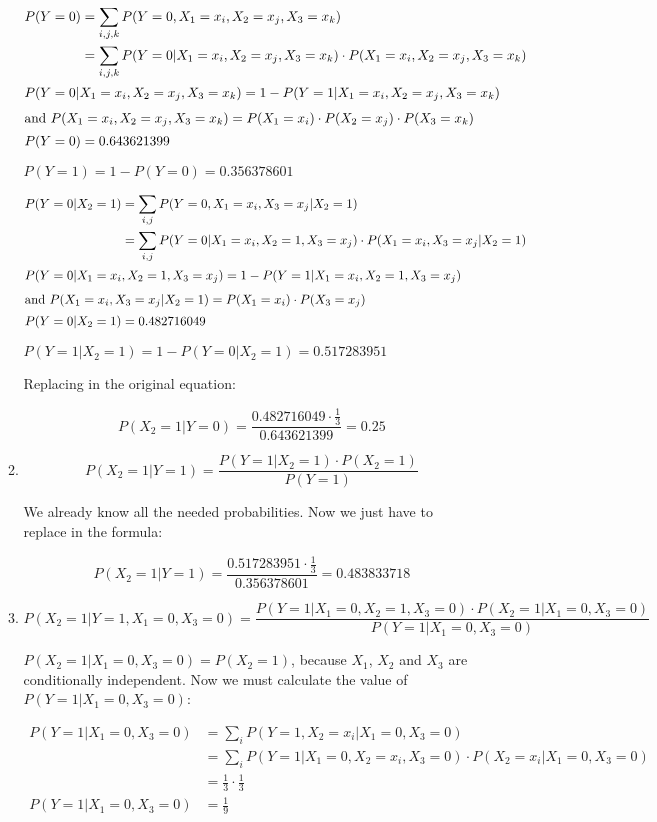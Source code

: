 \documentclass[11]{article}
\begin{document}
\begin{enumerate}[label=(\alph*)]
\begin{enumerate}[label*=.\arabic*]
\begin{align*}
P(Y=0) &= \sum_{i,j,k}P(Y=0,X_1=x_i,X_2=x_j,X_3=x_k)\\
&= \sum_{i,j,k}P(Y=0|X_1=x_i,X_2=x_j,X_3=x_k)\cdot P(X_1=x_i,X_2=x_j,X_3=x_k)\\
\intertext{$P(Y=0|X_1=x_i,X_2=x_j,X_3=x_k)=1-P(Y=1|X_1=x_i,X_2=x_j,X_3=x_k)$}
\intertext{and $P(X_1=x_i,X_2=x_j,X_3=x_k)=P(X_1=x_i)\cdot P(X_2=x_j)\cdot P(X_3=x_k)$}
P(Y=0) &=0.643621399
\end{align*}

$P(Y=1)=1-P(Y=0)=0.356378601$

\begin{align*}
P(Y=0|X_2=1) &= \sum_{i,j}P(Y=0,X_1=x_i,X_3=x_j|X_2=1)\\
&= \sum_{i,j}P(Y=0|X_1=x_i,X_2=1,X_3=x_j)\cdot P(X_1=x_i,X_3=x_j|X_2=1)\\
\intertext{$P(Y=0|X_1=x_i,X_2=1,X_3=x_j)=1-P(Y=1|X_1=x_i,X_2=1,X_3=x_j)$}
\intertext{and $P(X_1=x_i,X_3=x_j|X_2=1)=P(X_1=x_i)\cdot P(X_3=x_j)$}
P(Y=0|X_2=1)&=0.482716049
\end{align*}

$P(Y=1|X_2=1)=1-P(Y=0|X_2=1)=0.517283951$

Replacing in the original equation:

$$P(X_2=1|Y=0)=\frac{0.482716049 \cdot \frac{1}{3}}{0.643621399}=0.25$$

\item 
$$P(X_2=1|Y=1)=\frac{P(Y=1|X_2=1) \cdot P(X_2=1)}{P(Y=1)}$$

We already know all the needed probabilities. Now we just have to replace in the formula:

$$P(X_2=1|Y=1)=\frac{0.517283951 \cdot \frac{1}{3}}{0.356378601}=0.483833718$$

\item
$$P(X_2=1|Y=1,X_1=0,X_3=0)=\frac{P(Y=1|X_1=0,X_2=1,X_3=0) \cdot P(X_2=1|X_1=0,X_3=0)}{P(Y=1|X_1=0,X_3=0)}$$

$P(X_2=1|X_1=0,X_3=0)=P(X_2=1)$, because $X_1$, $X_2$ and $X_3$ are conditionally independent. Now we must calculate the value of $P(Y=1|X_1=0,X_3=0)$:

\begin{align*}
P(Y=1|X_1=0,X_3=0) &= \sum_{i}P(Y=1,X_2=x_i|X_1=0,X_3=0)\\
&= \sum_{i}P(Y=1|X_1=0,X_2=x_i,X_3=0)\cdot P(X_2=x_i|X_1=0,X_3=0)\\
&=\frac{1}{3} \cdot \frac{1}{3}\\
P(Y=1|X_1=0,X_3=0) &= \frac{1}{9}
\end{align*}


\end{enumerate}
\end{enumerate}
\end{document}
